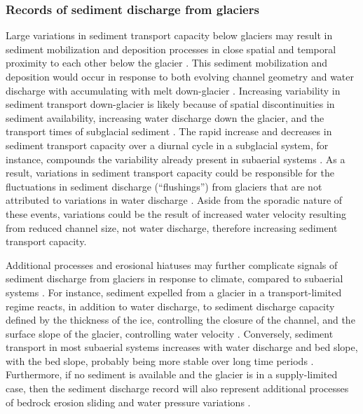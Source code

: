 \documentclass[11pt]{article}
\begin{document}
\begin{spacing}{1}
  
  \subsubsection{Records of sediment discharge  from glaciers}
  
  Large variations in sediment transport capacity below glaciers may result in sediment mobilization and deposition processes in close spatial and temporal proximity to each other below the glacier \citep{gimbert2016,perolo2018}.
  This sediment mobilization and deposition would occur in response to both evolving channel geometry and water discharge with accumulating with melt down-glacier \citep{beaud2018,delaney2019}.
  Increasing variability in sediment transport down-glacier is likely because of spatial discontinuities in sediment availability, increasing water discharge down the glacier, and the transport times of subglacial sediment \citep{williams1989,delaney2019}.
  The rapid increase and decreases in sediment transport capacity over a diurnal cycle in a subglacial system, for instance, compounds the variability already present in subaerial systems \citep{williams1989,jerolmack2010}.
  As a result, variations in sediment transport capacity could be responsible for the fluctuations in sediment discharge (``flushings'') from glaciers that are not attributed to variations in water discharge \citep[e.g.][]{richards2003,swift2021}.
  Aside from the sporadic nature of these events, variations could be the result of increased water velocity resulting from reduced channel size, not water discharge, therefore increasing sediment transport capacity.

  Additional processes and erosional hiatuses may further complicate signals of sediment discharge from glaciers in response to climate, compared to subaerial systems \citep{jansson2005,ganti2016}. 
  For instance, sediment expelled from a glacier in a transport-limited regime reacts, in addition to water discharge, to sediment discharge capacity defined by the thickness of the ice, controlling the closure of the channel, and the surface slope of the glacier, controlling water velocity \citep[Section~\ref{sect:sub_mode}; ] []{rothlisberger1972,shreve1972,delaney2022,stevens2022}.
  Conversely, sediment transport in most subaerial systems increases with water discharge and bed slope, with the bed slope, probably being more stable over long time periods \citep[Section~\ref{sect:fluv}; e.g.][]{muller1968,whipple1999,wong2006,wickert2019}. 
  Furthermore, if no sediment is available and the glacier is in a supply-limited case, then the sediment discharge record will also represent additional processes of bedrock erosion sliding and water pressure variations  \citep{iverson2012,herman2015}.
  

\end{spacing}
\end{document}
